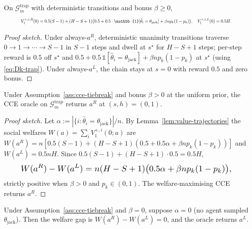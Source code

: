 \begin{lemma}
\label{lem:value-trajectories}
On $\mathcal{G}_m^{\mathrm{trap}}$ with deterministic transitions and bonus $\beta \geq 0$,
\begin{equation}\resizebox{0.9\linewidth}{!}{$\displaystyle V^{+, i, R}_1(0) = 0.5(S-1) + (H - S + 1)\big(0.5 + 0.5 \cdot \mathbb{1}[\hat\theta_i = \theta_{\mathrm{jack}}] + \beta n p_k(1 - p_k)\big), \quad V^{+, i, L}_1(0) = 0.5 H. $}\end{equation}
\end{lemma}

\begin{proof}[Proof sketch]
Under always-$a^R$, deterministic unanimity transitions traverse $0\to 1\to\cdots\to S-1$ in $S-1$ steps and dwell at $s^\star$ for $H-S+1$ steps; per-step reward is $0.5$ off $s^\star$ and $0.5+0.5\,\mathbb{1}[\hat\theta_i=\theta_{\mathrm{jack}}]+\beta n p_k(1-p_k)$ at $s^\star$ (using \eqref{eq:Dk-trap}). Under always-$a^L$, the chain stays at $s=0$ with reward $0.5$ and zero bonus.
\end{proof}

\begin{lemma}[CCE selects $a^R$ at $s_1 = 0$ under bonus]
\label{lem:cce-selects-aR}
Under Assumption~\ref{ass:cce-tiebreak} and bonus $\beta > 0$ at the uniform prior, the CCE oracle on $\mathcal{G}_m^{\mathrm{trap}}$ returns $a^R$ at $(s, h) = (0, 1)$.
\end{lemma}

\begin{proof}[Proof sketch]
Let $\alpha := |\{i:\hat\theta_i=\theta_{\mathrm{jack}}\}|/n$. By Lemma~\ref{lem:value-trajectories} the social welfares $W(a) = \sum_i V^{+,i}_1(0;a)$ are $W(a^R) = n[0.5(S-1)+(H-S+1)(0.5+0.5\alpha+\beta n p_k(1-p_k))]$ and $W(a^L) = 0.5nH$. Since $0.5(S-1)+(H-S+1)\cdot 0.5 = 0.5H$,
\begin{equation}\label{eq:welfare-gap}\resizebox{0.9\linewidth}{!}{$\displaystyle W(a^R) - W(a^L) = n(H-S+1)\big(0.5\alpha + \beta n p_k(1-p_k)\big), $}\end{equation}
strictly positive when $\beta > 0$ and $p_k\in(0,1)$. The welfare-maximising CCE returns $a^R$.
\end{proof}

\begin{lemma}
\label{lem:cce-selects-aL}
Under Assumption~\ref{ass:cce-tiebreak} and $\beta = 0$, suppose $\alpha = 0$ (no agent sampled $\theta_{\mathrm{jack}}$). Then the welfare gap is $W(a^R) - W(a^L) = 0$, and the oracle returns $a^L$.
\end{lemma}

